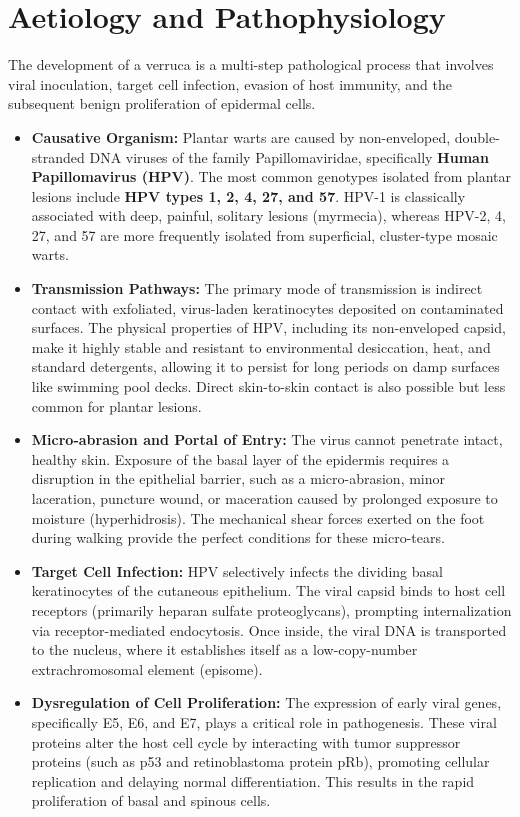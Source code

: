 \section*{Aetiology and Pathophysiology}
The development of a verruca is a multi-step pathological process that involves viral inoculation, target cell infection, evasion of host immunity, and the subsequent benign proliferation of epidermal cells.
\begin{itemize}
    \item \textbf{Causative Organism:} Plantar warts are caused by non-enveloped, double-stranded DNA viruses of the family Papillomaviridae, specifically \textbf{Human Papillomavirus (HPV)}. The most common genotypes isolated from plantar lesions include \textbf{HPV types 1, 2, 4, 27, and 57}. HPV-1 is classically associated with deep, painful, solitary lesions (myrmecia), whereas HPV-2, 4, 27, and 57 are more frequently isolated from superficial, cluster-type mosaic warts.
    \item \textbf{Transmission Pathways:} The primary mode of transmission is indirect contact with exfoliated, virus-laden keratinocytes deposited on contaminated surfaces. The physical properties of HPV, including its non-enveloped capsid, make it highly stable and resistant to environmental desiccation, heat, and standard detergents, allowing it to persist for long periods on damp surfaces like swimming pool decks. Direct skin-to-skin contact is also possible but less common for plantar lesions.
    \item \textbf{Micro-abrasion and Portal of Entry:} The virus cannot penetrate intact, healthy skin. Exposure of the basal layer of the epidermis requires a disruption in the epithelial barrier, such as a micro-abrasion, minor laceration, puncture wound, or maceration caused by prolonged exposure to moisture (hyperhidrosis). The mechanical shear forces exerted on the foot during walking provide the perfect conditions for these micro-tears.
    \item \textbf{Target Cell Infection:} HPV selectively infects the dividing basal keratinocytes of the cutaneous epithelium. The viral capsid binds to host cell receptors (primarily heparan sulfate proteoglycans), prompting internalization via receptor-mediated endocytosis. Once inside, the viral DNA is transported to the nucleus, where it establishes itself as a low-copy-number extrachromosomal element (episome).
    \item \textbf{Dysregulation of Cell Proliferation:} The expression of early viral genes, specifically E5, E6, and E7, plays a critical role in pathogenesis. These viral proteins alter the host cell cycle by interacting with tumor suppressor proteins (such as p53 and retinoblastoma protein pRb), promoting cellular replication and delaying normal differentiation. This results in the rapid proliferation of basal and spinous cells.

\end{itemize}
